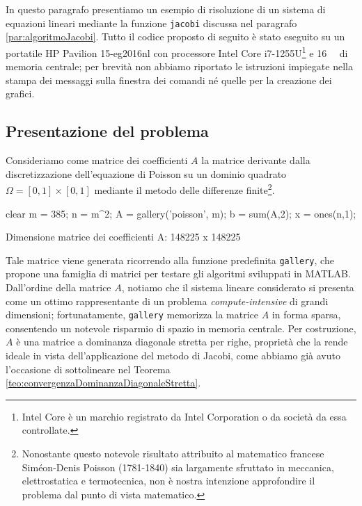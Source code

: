 In questo paragrafo presentiamo un esempio di risoluzione di un sistema di equazioni lineari mediante la funzione
\lstinline{jacobi} discussa nel paragrafo \ref{par:algoritmoJacobi}. \newline
Tutto il codice proposto di seguito \`e stato eseguito su un portatile HP Pavilion 15-eg2016nl con processore Intel\textsuperscript{\textregistered} Core\textsuperscript{\texttrademark} i7-1255U\footnote{Intel Core \`e un marchio registrato da Intel Corporation o da societ\`a da essa controllate.} e \qty{16}{\giga\byte} di memoria centrale; per brevit\`a non abbiamo riportato le istruzioni impiegate nella stampa dei messaggi sulla finestra dei comandi n\'e quelle per la creazione dei grafici.
\subsection{Presentazione del problema}
Consideriamo come matrice dei coefficienti $A$ la matrice derivante dalla discretizzazione dell'equazione di Poisson su un
dominio quadrato $\Omega=[0, 1]\times[0, 1]$ mediante il metodo delle differenze finite\footnote{
    Nonostante questo notevole risultato attribuito al matematico francese Sim\'eon-Denis Poisson (1781-1840) sia largamente sfruttato in meccanica,
    elettrostatica e termotecnica, non \`e nostra intenzione approfondire il problema dal punto di vista matematico.}.
\begin{matlabcode}
    clear
    m = 385;
    n = m^2;
    A = gallery('poisson', m);
    b = sum(A,2);
    x = ones(n,1);
\end{matlabcode}
\begin{matlaboutput}
    Dimensione matrice dei coefficienti A: 148225 x 148225
\end{matlaboutput}
Tale matrice viene generata ricorrendo alla funzione predefinita \lstinline{gallery}, che propone una famiglia di matrici per testare gli algoritmi sviluppati in MATLAB.\newline
Dall'ordine della matrice $A$, notiamo che il sistema lineare considerato si presenta come un ottimo rappresentante
di un problema \textit{compute-intensive} di grandi dimensioni; fortunatamente, \lstinline{gallery} memorizza la matrice $A$ in
forma sparsa, consentendo un notevole risparmio di spazio in memoria centrale.\newline
Per costruzione, $A$ \`e una matrice a dominanza diagonale stretta per righe, propriet\`a che la rende ideale
in vista dell'applicazione del metodo di Jacobi, come abbiamo gi\`a avuto l'occasione di sottolineare nel Teorema
\ref{teo:convergenzaDominanzaDiagonaleStretta}.

